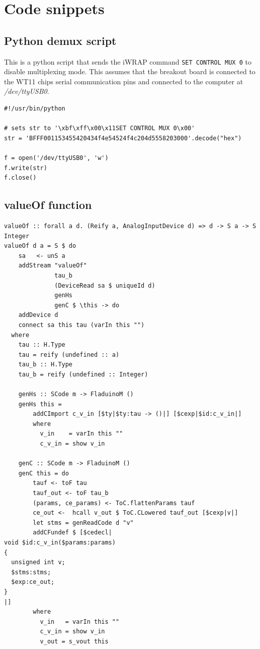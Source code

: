 \documentclass[a4paper, oneside, final]{memoir}
\begin{document}
\chapter{Code snippets}

\section{Python demux script}
\label{sec:python-demux-script}

This is a python script that sends the iWRAP command \texttt{SET CONTROL MUX 0}
to disable multiplexing mode. This assumes that the breakout board is connected
to the WT11 chips serial communication pins and connected to the computer at
\textit{/dev/ttyUSB0}.

\begin{verbatim}
#!/usr/bin/python

# sets str to '\xbf\xff\x00\x11SET CONTROL MUX 0\x00'
str = 'BFFF001153455420434f4e54524f4c204d5558203000'.decode("hex")

f = open('/dev/ttyUSB0', 'w')
f.write(str)
f.close()
\end{verbatim}

\section{valueOf function}
\label{sec:valueOf}

\begin{verbatim}
valueOf :: forall a d. (Reify a, AnalogInputDevice d) => d -> S a -> S Integer
valueOf d a = S $ do
    sa   <- unS a
    addStream "valueOf"
              tau_b
              (DeviceRead sa $ uniqueId d)
              genHs
              genC $ \this -> do
    addDevice d
    connect sa this tau (varIn this "")
  where
    tau :: H.Type
    tau = reify (undefined :: a)
    tau_b :: H.Type
    tau_b = reify (undefined :: Integer)

    genHs :: SCode m -> FladuinoM ()
    genHs this =
        addCImport c_v_in [$ty|$ty:tau -> ()|] [$cexp|$id:c_v_in|]
        where
          v_in    = varIn this ""
          c_v_in = show v_in

    genC :: SCode m -> FladuinoM ()
    genC this = do
        tauf <- toF tau
        tauf_out <- toF tau_b
        (params, ce_params) <- ToC.flattenParams tauf
        ce_out <-  hcall v_out $ ToC.CLowered tauf_out [$cexp|v|]
        let stms = genReadCode d "v"
        addCFundef $ [$cedecl|
void $id:c_v_in($params:params)
{
  unsigned int v;
  $stms:stms;
  $exp:ce_out;
}
|]
        where
          v_in   = varIn this ""
          c_v_in = show v_in
          v_out = s_vout this
\end{verbatim}
\end{document}
